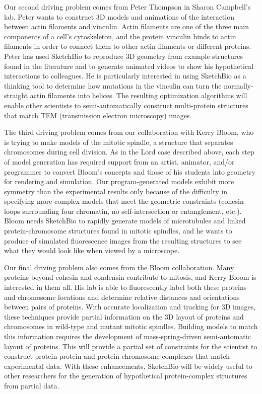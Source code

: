 \documentclass[twocolumn]{bmcart}%
\begin{document}
Our second driving problem comes from Peter Thompson in Sharon Campbell's lab.
Peter wants to construct 3D models and animations of the interaction between actin filaments and vinculin.
Actin filaments are one of the three main components of a cell's cytoskeleton, and the protein vinculin binds to actin filaments in order to connect them to other actin filaments or different proteins.
Peter has used SketchBio to reproduce 3D geometry from example structures found in the literature and to generate animated videos to show his hypothetical interactions to colleagues.
He is particularly interested in using SketchBio as a thinking tool to determine how mutations in the vinculin can turn the normally-straight actin filaments into helices.
The resulting optimization algorithms will enable other scientists to semi-automatically construct multi-protein structures that match TEM (transmission electron microscopy) images.

The third driving problem comes from our collaboration with Kerry Bloom, who is trying to make models of the mitotic spindle, a structure that separates chromosomes during cell division.
As in the Lord case described above, each step of model generation has required support from an artist, animator, and/or programmer to convert Bloom's concepts and those of his students into geometry for rendering and simulation.
Our program-generated models exhibit more symmetry than the experimental results only because of the difficulty in specifying more complex models that meet the geometric constraints (cohesin loops surrounding four chromatin, no self-intersection or entanglement, etc.).
Bloom needs SketchBio to rapidly generate models of microtubules and linked protein-chromosome structures found in mitotic spindles, and he wants to produce of simulated fluorescence  images from the resulting structures to see what they would look like when viewed by a microscope.

Our final driving problem also comes from the Bloom collaboration.
Many proteins beyond cohesin and condensin contribute to mitosis, and Kerry Bloom is interested in them all.  His lab is able to fluorescently label both these proteins and chromosome locations and determine relative distances and orientations between pairs of proteins.
With accurate localization and tracking for 3D images, these techniques provide partial information on the 3D layout of proteins and chromosomes in wild-type and mutant mitotic spindles.
Building models to match this information requires the development of mass-spring-driven semi-automatic layout of proteins.
This will provide a partial set of constraints for the scientist to construct protein-protein and protein-chromosome complexes that match experimental data.
With these enhancements, SketchBio will be widely useful to other researchers for the generation of hypothetical protein-complex structures from partial data.
\end{document}
